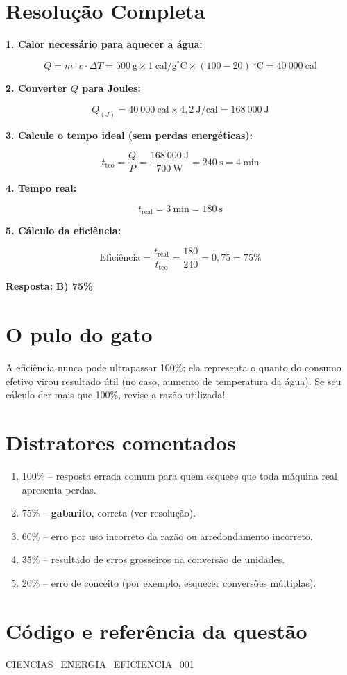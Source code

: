 \documentclass{article}
\begin{document}
\section*{Resolução Completa}
\textbf{1. Calor necessário para aquecer a água:}

\begin{equation*}
Q = m \cdot c \cdot \Delta T = 500~\text{g} \times 1~\text{cal/g}^{\circ}\text{C} \times (100 - 20)~^{\circ}\text{C} = 40~000~\text{cal}
\end{equation*}

\textbf{2. Converter $Q$ para Joules:}

\begin{equation*}
Q_{(J)} = 40~000~\text{cal} \times 4,2~\text{J/cal} = 168~000~\text{J}
\end{equation*}

\textbf{3. Calcule o tempo ideal (sem perdas energéticas):}

\begin{equation*}
t_{\text{teo}} = \frac{Q}{P} = \frac{168~000~\text{J}}{700~\text{W}} = 240~\text{s} = 4~\text{min}
\end{equation*}

\textbf{4. Tempo real:}

\begin{equation*}
t_{\text{real}} = 3~\text{min} = 180~\text{s}
\end{equation*}

\textbf{5. Cálculo da eficiência:}

\begin{equation*}
\text{Eficiência} = \frac{t_{\text{real}}}{t_{\text{teo}}} = \frac{180}{240} = 0,75 = 75\%
\end{equation*}

\noindent
\textbf{Resposta:} \textbf{B) 75\%}

\section*{O pulo do gato}
A eficiência nunca pode ultrapassar 100\%; ela representa o quanto do consumo efetivo virou resultado útil (no caso, aumento de temperatura da água). Se seu cálculo der mais que 100\%, revise a razão utilizada!

\section*{Distratores comentados}
\begin{enumerate}[label=\textbf{(\Alph*)}]
    \item 100\% -- resposta errada comum para quem esquece que toda máquina real apresenta perdas.
    \item 75\% -- \textbf{gabarito}, correta (ver resolução).
    \item 60\% -- erro por uso incorreto da razão ou arredondamento incorreto.
    \item 35\% -- resultado de erros grosseiros na conversão de unidades.
    \item 20\% -- erro de conceito (por exemplo, esquecer conversões múltiplas).
\end{enumerate}

\section*{Código e referência da questão}
CIENCIAS\_ENERGIA\_EFICIENCIA\_001
\end{document}
